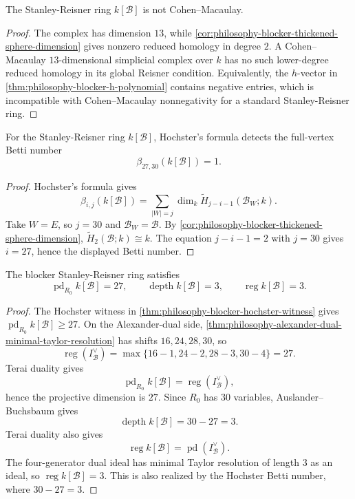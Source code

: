 \begin{theorem}
\label{thm:philosophy-blocker-ring-non-cohen-macaulay}
The Stanley-Reisner ring $k[\mathcal{B}]$ is not Cohen--Macaulay.
\end{theorem}
\begin{proof}
The complex has dimension $13$, while
\autoref{cor:philosophy-blocker-thickened-sphere-dimension} gives
nonzero reduced homology in degree $2$. A Cohen--Macaulay
$13$-dimensional simplicial complex over $k$ has no such lower-degree
reduced homology in its global Reisner condition. Equivalently, the
$h$-vector in \autoref{thm:philosophy-blocker-h-polynomial} contains
negative entries, which is incompatible with Cohen--Macaulay
nonnegativity for a standard Stanley-Reisner ring.
\end{proof}

\begin{theorem}
\label{thm:philosophy-blocker-hochster-witness}
For the Stanley-Reisner ring $k[\mathcal{B}]$, Hochster's formula
detects the full-vertex Betti number
$$
  \beta_{27,30}(k[\mathcal{B}])=1.
$$
\end{theorem}
\begin{proof}
Hochster's formula gives
$$
  \beta_{i,j}(k[\mathcal{B}])
  =
  \sum_{|W|=j}
  \dim_{k}\widetilde{H}_{j-i-1}(\mathcal{B}_{W};k).
$$
Take $W=E$, so $j=30$ and $\mathcal{B}_{W}=\mathcal{B}$. By
\autoref{cor:philosophy-blocker-thickened-sphere-dimension},
$\widetilde{H}_{2}(\mathcal{B};k)\cong k$. The equation
$j-i-1=2$ with $j=30$ gives $i=27$, hence the displayed Betti number.
\end{proof}

\begin{theorem}
\label{thm:philosophy-blocker-depth-regularity}
The blocker Stanley-Reisner ring satisfies
$$
  \operatorname{pd}_{R_{0}}k[\mathcal{B}]=27,
  \qquad
  \operatorname{depth}k[\mathcal{B}]=3,
  \qquad
  \operatorname{reg}k[\mathcal{B}]=3.
$$
\end{theorem}
\begin{proof}
The Hochster witness in
\autoref{thm:philosophy-blocker-hochster-witness} gives
$\operatorname{pd}_{R_{0}}k[\mathcal{B}]\geq27$. On the Alexander-dual
side, \autoref{thm:philosophy-alexander-dual-minimal-taylor-resolution}
has shifts $16,24,28,30$, so
$$
  \operatorname{reg}(I_{\mathcal{B}}^{\vee})
  =
  \max\{16-1,24-2,28-3,30-4\}
  =
  27.
$$
Terai duality gives
$$
  \operatorname{pd}_{R_{0}}k[\mathcal{B}]
  =
  \operatorname{reg}(I_{\mathcal{B}}^{\vee}),
$$
hence the projective dimension is $27$. Since $R_{0}$ has $30$
variables, Auslander--Buchsbaum gives
$$
  \operatorname{depth}k[\mathcal{B}]=30-27=3.
$$
Terai duality also gives
$$
  \operatorname{reg}k[\mathcal{B}]
  =
  \operatorname{pd}(I_{\mathcal{B}}^{\vee}).
$$
The four-generator dual ideal has minimal Taylor resolution of length
$3$ as an ideal, so $\operatorname{reg}k[\mathcal{B}]=3$. This is also
realized by the Hochster Betti number, where $30-27=3$.
\end{proof}

